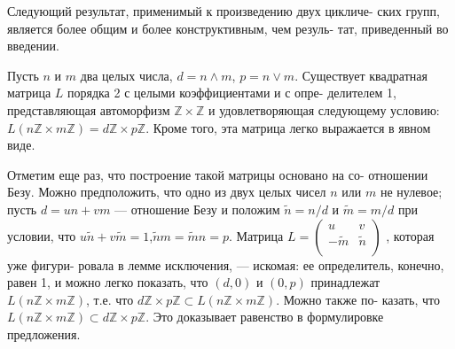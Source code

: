 \documentclass{mai_book}
\begin{document}
Следующий результат, применимый к произведению двух цикличе- \linebreak ских групп, является более общим и более конструктивным, чем резуль- \linebreak тат, приведенный во введении.  
\begin{predl}
Пусть $n$ и $m$ два целых числа, $d = n \wedge m$, $p = n \vee m$. Существует \linebreak квадратная матрица $L$ порядка 2 с целыми коэффициентами и с опре- \linebreak делителем 1, представляющая автоморфизм $\mathbb{Z} \times \mathbb{Z}$ и удовлетворяющая \linebreak следующему условию: $L(n\mathbb{Z} \times m\mathbb{Z}) = d\mathbb{Z} \times p\mathbb{Z}$. Кроме того, эта матрица \linebreak легко выражается в явном виде.
\end{predl}
\newpage
\begin{myproof}
Отметим еще раз, что построение такой матрицы основано на со- \linebreak отношении Безу. Можно предположить, что одно из двух целых \linebreak чисел $n$ или $m$ не нулевое; пусть $d = un +vm$ --- отношение Безу \linebreak и положим $\tilde{n} = n/d$ и $\tilde{m} = m/d$ при условии, что $u\tilde{n} + v\tilde{m} = 1$,\linebreak $\tilde{n}m = \tilde{m}n = p$. Матрица $L = {\left( \begin{array}{ccc}
u & v \\
-\tilde{m} & \tilde{n} \\
\end{array} \right)}$ , которая уже фигури- \linebreak ровала в лемме исключения, — искомая: ее определитель, конечно, \linebreak равен 1, и можно легко показать, что $(d, 0)$ и $(0, p)$ принадлежат \linebreak $L(n\mathbb{Z} \times m\mathbb{Z})$, т.е. что $d\mathbb{Z} \times p\mathbb{Z} \subset L(n\mathbb{Z} \times m\mathbb{Z})$. Можно также по- \linebreak казать, что $L(n\mathbb{Z} \times m\mathbb{Z})\subset d\mathbb{Z} \times p\mathbb{Z}$. Это доказывает равенство в \linebreak формулировке предложения.
\end{myproof}
\end{document}

